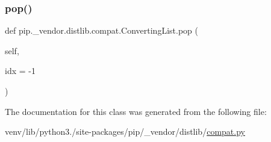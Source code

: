 \subsubsection{\texorpdfstring{pop()}{pop()}}
{\footnotesize\ttfamily def pip.\+\_\+vendor.\+distlib.\+compat.\+Converting\+List.\+pop (\begin{DoxyParamCaption}\item[{}]{self,  }\item[{}]{idx = {\ttfamily -\/1} }\end{DoxyParamCaption})}



The documentation for this class was generated from the following file\+:\begin{DoxyCompactItemize}
\item 
venv/lib/python3./site-\/packages/pip/\+\_\+vendor/distlib/\hyperlink{__vendor_2distlib_2compat_8py}{compat.\+py}\end{DoxyCompactItemize}
